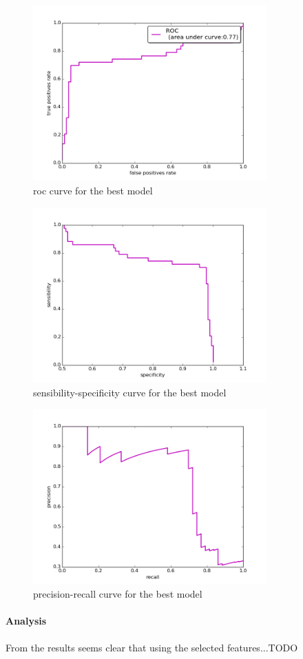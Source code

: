 \begin{figure}[h]
	\centering
	\includegraphics[width= 0.8\textwidth]{chapter4/roc.png}
	\caption{roc curve for the best model}
	\label{fig:roc_best}
\end{figure}

\begin{figure}[h]
	\centering
	\includegraphics[width= 0.8\textwidth]{chapter4/sensibility_specificity.png}
	\caption{sensibility-specificity curve for the best model}
	\label{fig:sensibility_specificity_best}
\end{figure}

\begin{figure}[h]
	\centering
	\includegraphics[width= 0.8\textwidth]{chapter4/precision_recall.png}
	\caption{precision-recall curve for the best model}
	\label{fig:precision_recall_best}
\end{figure}

\paragraph{Analysis}
From the results seems clear that using the selected features...TODO
